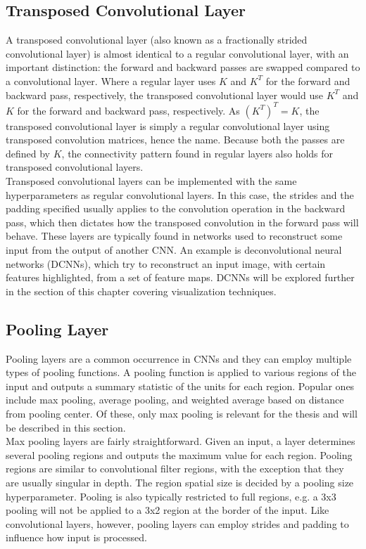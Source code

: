 \subsection{Transposed Convolutional Layer}

A transposed convolutional layer (also known as a fractionally strided convolutional layer) is almost identical to a regular convolutional layer, with an important distinction: the forward and backward passes are swapped compared to a convolutional layer. Where a regular layer uses $K$ and $K^T$ for the forward and backward pass, respectively, the transposed convolutional layer would use $K^T$ and $K$ for the forward and backward pass, respectively. As $(K^T)^T=K$, the transposed convolutional layer is simply a regular convolutional layer using transposed convolution matrices, hence the name. Because both the passes are defined by $K$, the connectivity pattern found in regular layers also holds for transposed convolutional layers. \\

\noindent Transposed convolutional layers can be implemented with the same hyperparameters as regular convolutional layers. In this case, the strides and the padding specified usually applies to the convolution operation in the backward pass, which then dictates how the transposed convolution in the forward pass will behave. These layers are typically found in networks used to reconstruct some input from the output of another CNN. An example is deconvolutional neural networks (DCNNs), which try to reconstruct an input image, with certain features highlighted, from a set of feature maps. DCNNs will be explored further in the section of this chapter covering visualization techniques.

\subsection{Pooling Layer}

Pooling layers are a common occurrence in CNNs and they can employ multiple types of pooling functions. A pooling function is applied to various regions of the input and outputs a summary statistic of the units for each region. Popular ones include max pooling, average pooling, and weighted average based on distance from pooling center. Of these, only max pooling is relevant for the thesis and will be described in this section. \\

\noindent Max pooling layers are fairly straightforward. Given an input, a layer determines several pooling regions and outputs the maximum value for each region. Pooling regions are similar to convolutional filter regions, with the exception that they are usually singular in depth. The region spatial size is decided by a pooling size hyperparameter. Pooling is also typically restricted to full regions, e.g. a 3x3 pooling will not be applied to a 3x2 region at the border of the input. Like convolutional layers, however, pooling layers can employ strides and padding to influence how input is processed.


